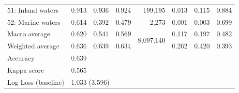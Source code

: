 \begin{table}[!hbt]
{\begin{tabular}{lrrrrrrr}
        51: Inland waters             						& 0.913 & 0.936 & 0.924	&   199,195	& 0.013 & 0.115 & 0.884 \\
        52: Marine waters             						& 0.614 & 0.392 & 0.479	&     2,273	& 0.001 & 0.003 & 0.699 \\
        \midrule
        Macro average    & 0.620         & 0.541     & 0.569    & \multicolumn{1}{c}{\multirow{2}{*}{8,097,140}} & 0.117 & 0.197 & 0.482 \\
        Weighted average & 0.636         & 0.639     & 0.634    & \multicolumn{1}{c}{} & 0.262 & 0.420 & 0.393                        \\ 
        \midrule
        Accuracy         & \multicolumn{4}{l}{0.639}                                                           \\
        Kappa score       & \multicolumn{4}{l}{0.565}                                                           \\
        Log Loss (baseline) & \multicolumn{4}{l}{1.033 (3.596)}                      \\
        \bottomrule
        \end{tabular}%
        }
        \end{table}

